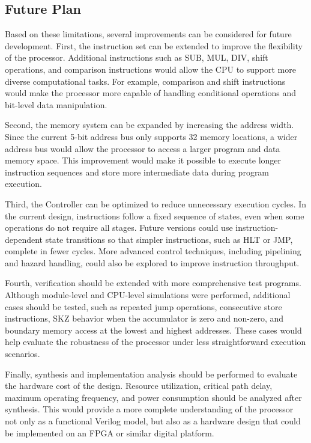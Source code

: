 \subsection{Future Plan}
Based on these limitations, several improvements can be considered for future development. First, the instruction set can be extended to improve the flexibility of the processor. Additional instructions such as SUB, MUL, DIV, shift operations, and comparison instructions would allow the CPU to support more diverse computational tasks. For example, comparison and shift instructions would make the processor more capable of handling conditional operations and bit-level data manipulation.

Second, the memory system can be expanded by increasing the address width. Since the current 5-bit address bus only supports 32 memory locations, a wider address bus would allow the processor to access a larger program and data memory space. This improvement would make it possible to execute longer instruction sequences and store more intermediate data during program execution.

Third, the Controller can be optimized to reduce unnecessary execution cycles. In the current design, instructions follow a fixed sequence of states, even when some operations do not require all stages. Future versions could use instruction-dependent state transitions so that simpler instructions, such as HLT or JMP, complete in fewer cycles. More advanced control techniques, including pipelining and hazard handling, could also be explored to improve instruction throughput.

Fourth, verification should be extended with more comprehensive test programs. Although module-level and CPU-level simulations were performed, additional cases should be tested, such as repeated jump operations, consecutive store instructions, SKZ behavior when the accumulator is zero and non-zero, and boundary memory access at the lowest and highest addresses. These cases would help evaluate the robustness of the processor under less straightforward execution scenarios.

Finally, synthesis and implementation analysis should be performed to evaluate the hardware cost of the design. Resource utilization, critical path delay, maximum operating frequency, and power consumption should be analyzed after synthesis. This would provide a more complete understanding of the processor not only as a functional Verilog model, but also as a hardware design that could be implemented on an FPGA or similar digital platform.

